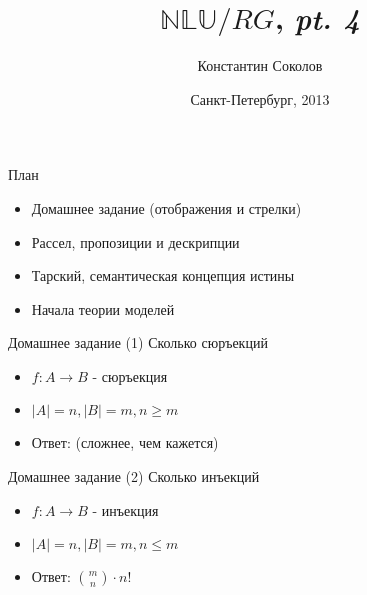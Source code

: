 \documentclass{beamer}
\begin{document}
\title{\huge{$\mathbb{NLU}/RG$, \textit{pt. 4}}}
\author{Константин Соколов}
\date{Санкт-Петербург, 2013} 
\begin{frame}
    \thispagestyle{empty}
    \titlepage
\end{frame}

\begin{frame}{План}
    \setcounter{framenumber}{1}
    \begin{itemize}
        \item Домашнее задание (отображения и стрелки)
        \item Рассел, пропозиции и дескрипции
        \item Тарский, семантическая концепция истины
        \item Начала теории моделей
    \end{itemize}
\end{frame}

\begin{frame}{Домашнее задание (1)}
Сколько сюръекций\\
\bigskip
  \begin{itemize}
    \item $f : A \to B$ - сюръекция
    \item $\left\vert{A}\right\vert = n, \left\vert{B}\right\vert = m, n \geq m$
    \item Ответ: (сложнее, чем кажется)
  \end{itemize}  
\end{frame}

\begin{frame}{Домашнее задание (2)}
Сколько инъекций\\
\bigskip
  \begin{itemize}
    \item $f : A \to B$ - инъекция
    \item $\left\vert{A}\right\vert = n, \left\vert{B}\right\vert = m, n \leq m$
    \item Ответ: ${m \choose n} \cdot n!$
  \end{itemize}  
\end{frame}
\end{document}

